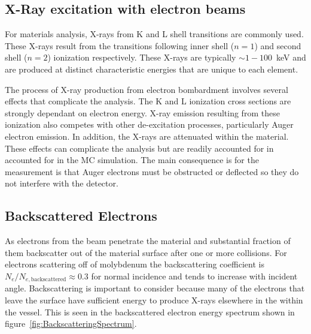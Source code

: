 \documentclass[12pt,letterpaper,final]{article}
\begin{document}
\subsection{X-Ray excitation with electron beams}

For materials analysis, X-rays from K and L shell transitions are commonly used. These X-rays result from the transitions following inner shell ($n=1$) and second shell ($n=2$) ionization respectively. These X-rays are typically $\sim 1 - 100$~keV and are produced at distinct characteristic energies that are unique to each element.

The process of X-ray production from electron bombardment involves several effects that complicate the analysis. The K and L ionization cross sections are strongly dependant on electron energy. X-ray emission resulting from these ionization also competes with other de-excitation processes, particularly Auger electron emission. In addition, the X-rays are attenuated within the material. These effects can complicate the analysis but are readily accounted for in accounted for in the MC simulation. The main consequence is for the measurement is that Auger electrons must be obstructed or deflected so they do not interfere with the detector.

\subsection{Backscattered Electrons}

As electrons from the beam penetrate the material and substantial fraction of them backscatter out of the material surface after one or more collisions.  For electrons scattering off of molybdenum the backscattering coefficient is $N_e/N_{e,\mathrm{backscattered}} \approx	0.3$ for normal incidence and tends to increase with incident angle. Backscattering is important to consider because many of the electrons that leave the surface have sufficient energy to produce X-rays elsewhere in the within the vessel. This is seen in the backscattered electron energy spectrum shown in figure~\ref{fig:BackscatteringSpectrum}.
\end{document}
